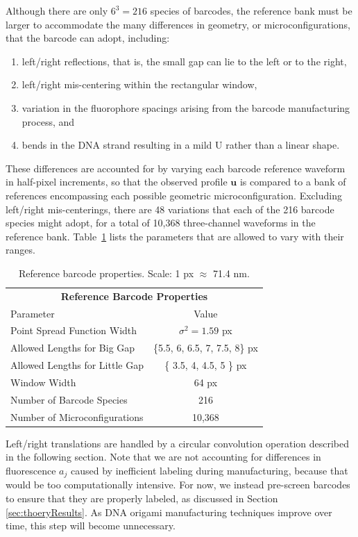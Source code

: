 Although there are only $6^3=216$ species of barcodes, the reference bank must be larger to accommodate the many differences in geometry, or microconfigurations, that the barcode can adopt, including:
\begin{enumerate}
\item left/right reflections, that is, the small gap can lie to the left or to the right,
\item left/right mis-centering within the rectangular window,
\item variation in the fluorophore spacings arising from the barcode manufacturing process, and
\item bends in the DNA strand resulting in a mild U rather than a linear shape.
\end{enumerate}
These differences are accounted for by varying each barcode reference waveform in half-pixel increments, so that the observed profile $\mathbf{u}$ is compared to a bank of references encompassing each possible geometric microconfiguration. Excluding left/right mis-centerings, there are 48 variations that each of the 216 barcode species might adopt, for a total of 10,368 three-channel waveforms in the reference bank. Table~\ref{table:reference} lists the parameters that are allowed to vary with their ranges.

\begin{table}[htbp] 	
\begin{center}
\begin{tabular}{l c}
\multicolumn{2}{c}{\textbf{Reference Barcode Properties}}\\
Parameter & Value \\
\hline
Point Spread Function Width  & $\sigma^2=1.59$ px \\
Allowed Lengths for Big Gap &  \{5.5, 6, 6.5, 7, 7.5, 8\} px \\
Allowed Lengths for Little Gap  & \{ 3.5, 4, 4.5, 5 \} px\\
Window Width & 64 px\\
Number of Barcode Species & 216 \\
Number of Microconfigurations & 10,368 \\
\hline
\end{tabular}
\caption{Reference barcode properties. Scale: 1 px $\approx$ 71.4 nm.\label{table:reference}}
\end{center}
\end{table}

Left/right translations are handled by a circular convolution operation described in the following section.  Note that we are not accounting for differences in fluorescence $a_j$ caused by inefficient labeling during manufacturing,  because that would be too computationally intensive. For now, we instead pre-screen barcodes to ensure that they are properly labeled, as discussed in Section  \ref{sec:thoeryResults}. As DNA origami manufacturing techniques improve over time, this step will become unnecessary. 

